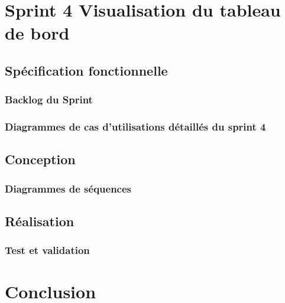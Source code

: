 \section{Sprint 4 Visualisation du tableau de bord}
\subsection{Spécification fonctionnelle}
\subsubsection{Backlog du Sprint}
\subsubsection{Diagrammes de cas d’utilisations détaillés du sprint 4}
\subsection{Conception}
   \subsubsection{Diagrammes de séquences}
\subsection{Réalisation}
\subsubsection{Test et validation}

   
   
\section*{Conclusion}
